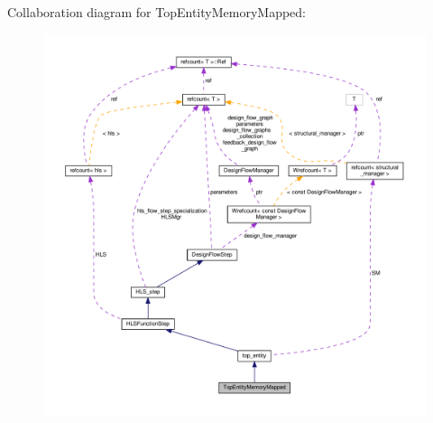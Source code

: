 Collaboration diagram for Top\+Entity\+Memory\+Mapped\+:
\nopagebreak
\begin{figure}[H]
\begin{center}
\leavevmode
\includegraphics[width=350pt]{d2/d41/classTopEntityMemoryMapped__coll__graph}
\end{center}
\end{figure}
